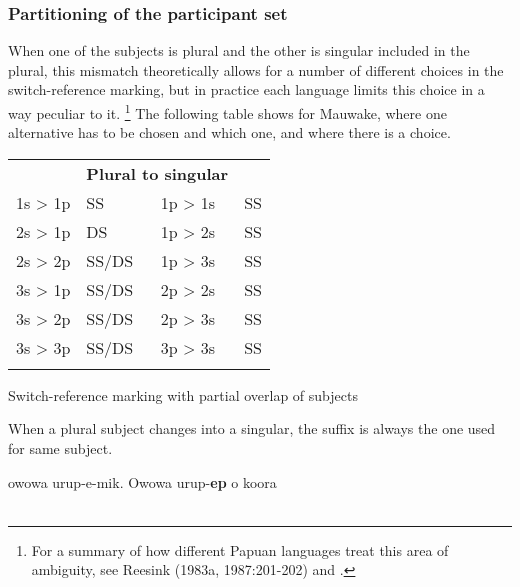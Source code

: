 \subsubsection[Partitioning of the participant set]{Partitioning of the participant set}
\hypertarget{RefHeading23181935131865}{}
When one of the subjects is plural and the other is singular included in the plural, this mismatch theoretically allows for a number of different choices in the switch-reference marking, but in practice each language limits this choice in a way peculiar to it.\textsuperscript{} \footnote{For a summary of how different Papuan languages treat this area of ambiguity, see Reesink (1983a, 1987:201-202) and \citet[87-91]{Roberts1988}.} The following table shows for Mauwake, where one alternative has to be chosen and which one, and where there is a choice. 





\begin{tabular}{llll}
\mytoprule


\multicolumn{2}{l}{{\bfseries Singular to plural}}

 & \multicolumn{2}{l}{{\bfseries Plural to singular}}

\\
1s  {{\textgreater}}  1p & SS & 1p  {{\textgreater}}  1s & SS\\
2s  {{\textgreater}}  1p & DS & 1p  {{\textgreater}}  2s & SS\\
2s  {{\textgreater}}  2p & SS/DS & 1p  {{\textgreater}}  3s & SS\\
3s  {{\textgreater}}  1p & SS/DS & 2p  {{\textgreater}}  2s & SS\\
3s  {{\textgreater}}  2p & SS/DS & 2p  {{\textgreater}}  3s & SS\\
3s  {{\textgreater}}  3p & SS/DS & 3p  {{\textgreater}}  3s & SS\\
\mybottomrule
\end{tabular}



\begin{table}
\caption{Switch-reference marking with partial overlap of subjects}
\label{tab:15}
\end{table}

When a plural subject changes into a singular, the suffix is always the one used for same subject. 

\ea%
\label{ex:x1438}
\gll {\dots}owowa  urup-e-mik.  Owowa  urup-\textbf{ep } o  koora \\
      \\
\glt
\z

